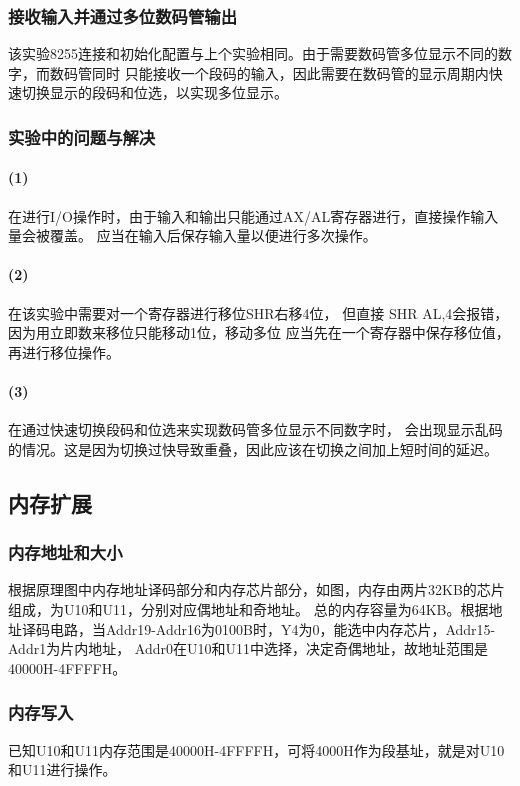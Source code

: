 \documentclass[12pt, a4paper, oneside]{ctexart}
\begin{document}
    \subsubsection{接收输入并通过多位数码管输出}
    该实验8255连接和初始化配置与上个实验相同。由于需要数码管多位显示不同的数字，而数码管同时
    只能接收一个段码的输入，因此需要在数码管的显示周期内快速切换显示的段码和位选，以实现多位显示。

    \subsubsection{实验中的问题与解决}
    \paragraph{(1)} 在进行I/O操作时，由于输入和输出只能通过AX/AL寄存器进行，直接操作输入量会被覆盖。
    应当在输入后保存输入量以便进行多次操作。

    \paragraph{(2)} 在该实验中需要对一个寄存器进行移位SHR右移4位，
    但直接 SHR AL,4会报错，因为用立即数来移位只能移动1位，移动多位
    应当先在一个寄存器中保存移位值，再进行移位操作。

    \paragraph{(3)} 在通过快速切换段码和位选来实现数码管多位显示不同数字时，
    会出现显示乱码的情况。这是因为切换过快导致重叠，因此应该在切换之间加上短时间的延迟。


    

    \subsection{内存扩展}
    \subsubsection{内存地址和大小}
    根据原理图中内存地址译码部分和内存芯片部分，如图，内存由两片32KB的芯片组成，为U10和U11，分别对应偶地址和奇地址。
    总的内存容量为64KB。根据地址译码电路，当Addr19-Addr16为0100B时，Y4为0，能选中内存芯片，Addr15-Addr1为片内地址，
    Addr0在U10和U11中选择，决定奇偶地址，故地址范围是40000H-4FFFFH。
    \subsubsection{内存写入}
    已知U10和U11内存范围是40000H-4FFFFH，可将4000H作为段基址，就是对U10和U11进行操作。
\end{document}
